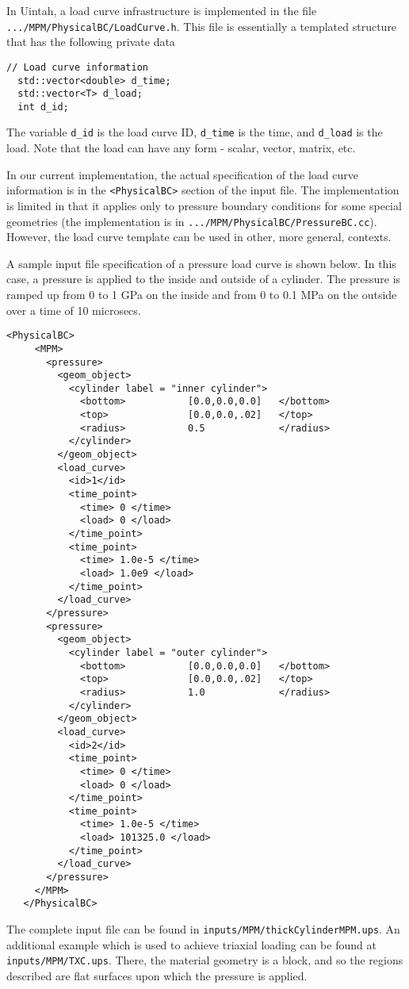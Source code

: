 In Uintah, a load curve infrastructure is implemented in the file \\
\verb|.../MPM/PhysicalBC/LoadCurve.h|.  This file is essentially a templated
structure that has the following private data
\begin{Verbatim}[fontsize=\footnotesize]
  // Load curve information 
  std::vector<double> d_time;
  std::vector<T> d_load;
  int d_id;
\end{Verbatim}
The variable \verb|d_id| is the load curve ID, \verb|d_time| is the time,
and \verb|d_load| is the load.  Note that the load can have any form - scalar,
vector, matrix, etc.

In our current implementation, the actual specification of the load curve
information is in the \verb|<PhysicalBC>| section of the input file.  The
implementation is limited in that it applies only to pressure boundary
conditions for some special geometries (the implementation is in
\verb|.../MPM/PhysicalBC/PressureBC.cc|).  However, the load curve template can
be used in other, more general, contexts.

A sample input file specification of a pressure load curve is shown below.
In this case, a pressure is applied to the inside and outside of a cylinder.
The pressure is ramped up from 0 to 1 GPa on the inside and from 0 to 0.1 MPa
on the outside over a time of 10 microsecs.
\begin{Verbatim}[fontsize=\footnotesize]
   <PhysicalBC>
     <MPM>
       <pressure>
         <geom_object>
           <cylinder label = "inner cylinder">
             <bottom>           [0.0,0.0,0.0]   </bottom>
             <top>              [0.0,0.0,.02]   </top>
             <radius>           0.5             </radius>
           </cylinder>
         </geom_object>
         <load_curve>
           <id>1</id>
           <time_point>
             <time> 0 </time>
             <load> 0 </load>
           </time_point>
           <time_point>
             <time> 1.0e-5 </time>
             <load> 1.0e9 </load>
           </time_point>
         </load_curve>
       </pressure>
       <pressure>
         <geom_object>
           <cylinder label = "outer cylinder">
             <bottom>           [0.0,0.0,0.0]   </bottom>
             <top>              [0.0,0.0,.02]   </top>
             <radius>           1.0             </radius>
           </cylinder>
         </geom_object>
         <load_curve>
           <id>2</id>
           <time_point>
             <time> 0 </time>
             <load> 0 </load>
           </time_point>
           <time_point>
             <time> 1.0e-5 </time>
             <load> 101325.0 </load>
           </time_point>
         </load_curve>
       </pressure>
     </MPM>
   </PhysicalBC>
\end{Verbatim}
The complete input file can be found in \verb|inputs/MPM/thickCylinderMPM.ups|. 
An additional example which is used to achieve triaxial loading can be found
at \verb|inputs/MPM/TXC.ups|.  There, the material geometry is a block, and so
the regions described are flat surfaces upon which the pressure is applied.

